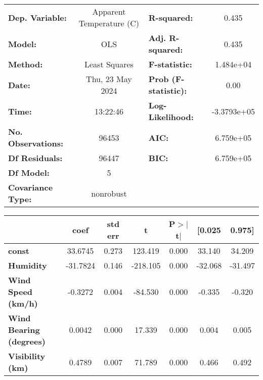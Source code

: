 \begin{center}
\begin{tabular}{lclc}
\toprule
\textbf{Dep. Variable:}         & Apparent Temperature (C) & \textbf{  R-squared:         } &      0.435   \\
\textbf{Model:}                 &           OLS            & \textbf{  Adj. R-squared:    } &      0.435   \\
\textbf{Method:}                &      Least Squares       & \textbf{  F-statistic:       } &  1.484e+04   \\
\textbf{Date:}                  &     Thu, 23 May 2024     & \textbf{  Prob (F-statistic):} &      0.00    \\
\textbf{Time:}                  &         13:22:46         & \textbf{  Log-Likelihood:    } & -3.3793e+05  \\
\textbf{No. Observations:}      &           96453          & \textbf{  AIC:               } &  6.759e+05   \\
\textbf{Df Residuals:}          &           96447          & \textbf{  BIC:               } &  6.759e+05   \\
\textbf{Df Model:}              &               5          & \textbf{                     } &              \\
\textbf{Covariance Type:}       &        nonrobust         & \textbf{                     } &              \\
\bottomrule
\end{tabular}
\begin{tabular}{lcccccc}
                                & \textbf{coef} & \textbf{std err} & \textbf{t} & \textbf{P$> |$t$|$} & \textbf{[0.025} & \textbf{0.975]}  \\
\midrule
\textbf{const}                  &      33.6745  &        0.273     &   123.419  &         0.000        &       33.140    &       34.209     \\
\textbf{Humidity}               &     -31.7824  &        0.146     &  -218.105  &         0.000        &      -32.068    &      -31.497     \\
\textbf{Wind Speed (km/h)}      &      -0.3272  &        0.004     &   -84.530  &         0.000        &       -0.335    &       -0.320     \\
\textbf{Wind Bearing (degrees)} &       0.0042  &        0.000     &    17.339  &         0.000        &        0.004    &        0.005     \\
\textbf{Visibility (km)}        &       0.4789  &        0.007     &    71.789  &         0.000        &        0.466    &        0.492     \\

\end{tabular}
\end{center}
